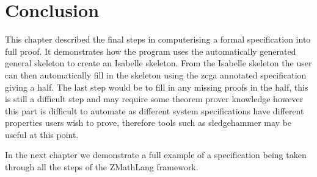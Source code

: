 \section{Conclusion}

This chapter described the final steps in computerising a formal specification
into full proof. It demonstrates how the program uses the automatically
generated general skeleton to  create an Isabelle skeleton. From the Isabelle
skeleton the user can then automatically fill in the skeleton using the
\gls{zcga} annotated specification giving a \gls{half}. The last step would be
to fill in any missing proofs in the \gls{half}, this is still a difficult step
and may require some theorem prover knowledge however this part is difficult to
automate as different system specifications have different properties users wish
to prove, therefore tools such as sledgehammer \cite{sledgehammer} may be useful
at this point.

In the next chapter we demonstrate a full example of a specification being
taken through all the steps of the ZMathLang framework.
